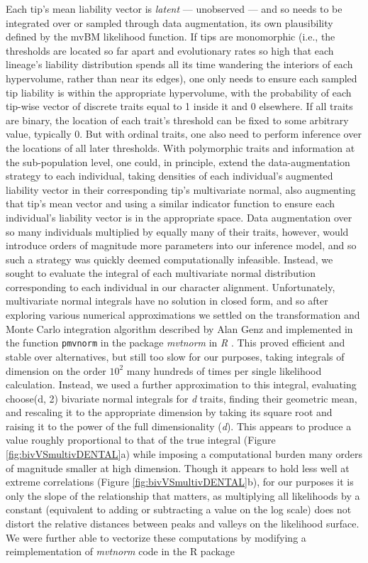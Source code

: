 \documentclass[10pt, twocolumn, twoside]{article}
\begin{document}
Each tip's mean liability vector is \textit{latent} --- unobserved --- and so needs to be integrated over or sampled through data augmentation, its own plausibility defined by the mvBM likelihood function. If tips are monomorphic (i.e., the thresholds are located so far apart and evolutionary rates so high that each lineage's liability distribution spends all its time wandering the interiors of each hypervolume, rather than near its edges), one only needs to ensure each sampled tip liability is within the appropriate hypervolume, with the probability of each tip-wise vector of discrete traits equal to 1 inside it and 0 elsewhere. If all traits are binary, the location of each trait's threshold can be fixed to some arbitrary value, typically 0. But with ordinal traits, one also need to perform inference over the locations of all later thresholds. With polymorphic traits and information at the sub-population level, one could, in principle, extend the data-augmentation strategy to each individual, taking densities of each individual's augmented liability vector in their corresponding tip's multivariate normal, also augmenting that tip's mean vector and using a similar indicator function to ensure each individual's liability vector is in the appropriate space. Data augmentation over so many individuals multiplied by equally many of their traits, however, would introduce orders of magnitude more parameters into our inference model, and so such a strategy was quickly deemed computationally infeasible. Instead, we sought to evaluate the integral of each multivariate normal distribution corresponding to each individual in our character alignment. Unfortunately, multivariate normal integrals have no solution in closed form, and so after exploring various numerical approximations we settled on the transformation and Monte Carlo integration algorithm described by Alan Genz \citep{genzNumericalComputationMultivariate1992} and implemented in the function \texttt{pmvnorm} in the package \textit{mvtnorm} \citep{genzPackageMvtnorm2020} in \textit{R} \citep{rcoreteamLanguageEnvironmentStatistical2013}. This proved efficient and stable over alternatives, but still too slow for our purposes, taking integrals of dimension on the order $10^2$ many hundreds of times per single likelihood calculation. Instead, we used a further approximation to this integral, evaluating choose(d, 2) bivariate normal integrals for \textit{d} traits, finding their geometric mean, and rescaling it to the appropriate dimension by taking its square root and raising it to the power of the full dimensionality (\textit{d}). This appears to produce a value roughly proportional to that of the true integral (Figure \ref{fig:bivVSmultivDENTAL}a) while imposing a computational burden many orders of magnitude smaller at high dimension. Though it appears to hold less well at extreme correlations (Figure \ref{fig:bivVSmultivDENTAL}b), for our purposes it is only the slope of the relationship that matters, as multiplying all likelihoods by a constant (equivalent to adding or subtracting a value on the log scale) does not distort the relative distances between peaks and valleys on the likelihood surface. We were further able to vectorize these computations by modifying a reimplementation of \textit{mvtnorm} code in the R package 
\end{document}
